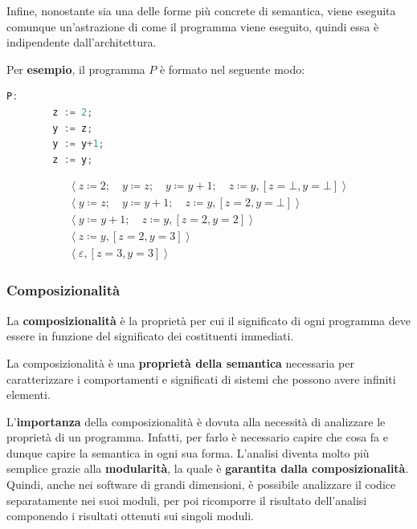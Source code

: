 \documentclass[a4paper]{article}
\begin{document}
	Infine, nonostante sia una delle forme più concrete di semantica, viene eseguita comunque un'astrazione di come il programma viene eseguito, quindi essa è indipendente dall'architettura.\newline
	
	\noindent
	Per \textcolor{Green4}{\textbf{esempio}}, il programma $P$ è formato nel seguente modo:
	\begin{lstlisting}[language=C]
		P:
		z := 2;
		y := z;
		y := y+1;
		z := y;\end{lstlisting}
	\begin{gather*}
		\left\langle z \coloneq 2; \hspace{1em} y \coloneq z; \hspace{1em} y \coloneq y+1; \hspace{1em} z \coloneq y, \left[z=\bot,y=\bot\right]\right\rangle \\
		\left\langle y \coloneq z; \hspace{1em} y \coloneq y+1; \hspace{1em} z \coloneq y, \left[z=2,y=\bot\right]\right\rangle \\		
		\left\langle y \coloneq y+1; \hspace{1em} z \coloneq y, \left[z=2,y=2\right]\right\rangle \\
		\left\langle z \coloneq y, \left[z=2,y=3\right]\right\rangle \\
		\left\langle \varepsilon, \left[z=3,y=3\right]\right\rangle
	\end{gather*}\newpage
	
	\subsubsection{Composizionalità}
	
	\begin{boxdef}
		La \textcolor{Red3}{\textbf{composizionalità}} è la proprietà per cui il significato di ogni programma deve essere in funzione del significato dei costituenti immediati.
	\end{boxdef}
	
	\noindent
	La composizionalità è una \textbf{proprietà della semantica} necessaria per caratterizzare i comportamenti e significati di sistemi che possono avere infiniti elementi.\newline
	
	\noindent
	L'\textbf{importanza} della composizionalità è dovuta alla necessità di analizzare le proprietà di un programma. Infatti, per farlo è necessario capire che cosa fa e dunque capire la semantica in ogni sua forma. L'analisi diventa molto più semplice grazie alla \textbf{modularità}, la quale è \textbf{garantita dalla composizionalità}. Quindi, anche nei software di grandi dimensioni, è possibile analizzare il codice separatamente nei suoi moduli, per poi ricomporre il risultato dell'analisi componendo i risultati ottenuti sui singoli moduli.
	
\end{document}
